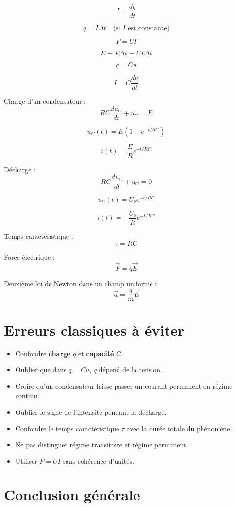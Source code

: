 \documentclass[11pt,a4paper]{article}
\begin{document}
\begin{important}
\[
I = \frac{dq}{dt}
\]

\[
q = I\Delta t \quad \text{(si } I \text{ est constante)}
\]

\[
P = UI
\]

\[
E = P\Delta t = UI\Delta t
\]

\[
q = Cu
\]

\[
I = C\frac{du}{dt}
\]

Charge d'un condensateur :
\[
RC\frac{du_C}{dt}+u_C=E
\]

\[
u_C(t)=E\left(1-e^{-t/RC}\right)
\]

\[
i(t)=\frac{E}{R}e^{-t/RC}
\]

Décharge :
\[
RC\frac{du_C}{dt}+u_C=0
\]

\[
u_C(t)=U_0e^{-t/RC}
\]

\[
i(t)=-\frac{U_0}{R}e^{-t/RC}
\]

Temps caractéristique :
\[
\tau = RC
\]

Force électrique :
\[
\vec{F}=q\vec{E}
\]

Deuxième loi de Newton dans un champ uniforme :
\[
\vec{a}=\frac{q}{m}\vec{E}
\]
\end{important}

\section{Erreurs classiques à éviter}

\begin{itemize}
    \item Confondre \textbf{charge} \(q\) et \textbf{capacité} \(C\).
    \item Oublier que dans \(q=Cu\), \(q\) dépend de la tension.
    \item Croire qu'un condensateur laisse passer un courant permanent en régime continu.
    \item Oublier le signe de l'intensité pendant la décharge.
    \item Confondre le temps caractéristique \(\tau\) avec la durée totale du phénomène.
    \item Ne pas distinguer régime transitoire et régime permanent.
    \item Utiliser \(P=UI\) sans cohérence d'unités.
\end{itemize}

\section{Conclusion générale}
\end{document}
